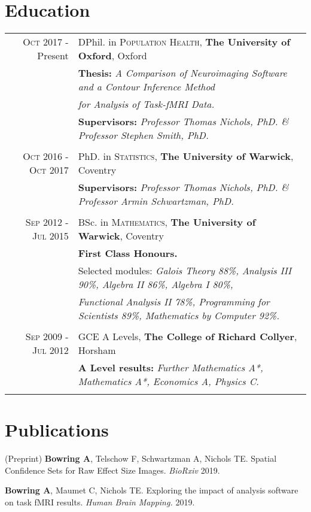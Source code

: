 \documentclass[a4paper,10pt]{article}
\begin{document}
\section{Education}
\begin{tabular}{rl}	
\textsc{Oct} 2017 - Present & DPhil. in \textsc{Population Health}, \textbf{The University of Oxford}, Oxford\\
& \textbf{Thesis:} \textit{A Comparison of Neuroimaging Software and a Contour Inference Method} \\& \textit{for Analysis of Task-fMRI Data.}\\
& \textbf{Supervisors:} \textit{Professor Thomas Nichols, PhD. \& Professor Stephen Smith, PhD.} \\&\\ 
\textsc{Oct} 2016 - \textsc{Oct} 2017 & PhD. in \textsc{Statistics}, \textbf{The University of Warwick}, Coventry\\
& \textbf{Supervisors:} \textit{Professor Thomas Nichols, PhD. \& Professor Armin Schwartzman, PhD.} \\&\\
\textsc{Sep} 2012 - \textsc{Jul} 2015 & BSc. in \textsc{Mathematics}, \textbf{The University of Warwick}, Coventry\\
& \textbf{First Class Honours.} \\
& Selected modules: \textit{Galois Theory 88\%, Analysis III 90\%, Algebra II 86\%, Algebra I 80\%,}\\
&\textit{Functional Analysis II 78\%, Programming for Scientists 89\%, Mathematics by Computer 92\%.}\\&\\
\textsc{Sep} 2009 - \textsc{Jul} 2012 & GCE A Levels, \textbf{The College of Richard Collyer}, Horsham\\
& \textbf{A Level results:} \textit{Further Mathematics A*, Mathematics A*, Economics A, Physics C.}\\&\\
\end{tabular}

\section{Publications}
(Preprint) \textbf{Bowring A}, Telschow F, Schwartzman A, Nichols TE. Spatial Confidence Sets for Raw Effect Size Images. \textit{BioRxiv} 2019. 

\textbf{Bowring A}, Maumet C, Nichols TE. Exploring the impact of analysis software on task fMRI results. \textit{Human Brain Mapping.} 2019. 
\end{document}
